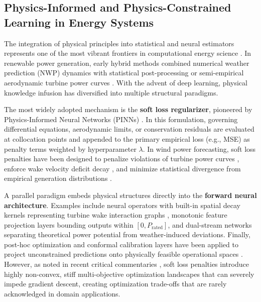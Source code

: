 \documentclass[preprint,3p,times]{elsarticle}
\begin{document}
\subsection{Physics-Informed and Physics-Constrained Learning in Energy Systems}
The integration of physical principles into statistical and neural estimators represents one of the most vibrant frontiers in computational energy science \cite{karniadakis2021physics,raissi2019physics}. In renewable power generation, early hybrid methods combined numerical weather prediction (NWP) dynamics with statistical post-processing or semi-empirical aerodynamic turbine power curves \cite{madsen2005,yan2016review}. With the advent of deep learning, physical knowledge infusion has diversified into multiple structural paradigms.

The most widely adopted mechanism is the \textbf{soft loss regularizer}, pioneered by Physics-Informed Neural Networks (PINNs) \cite{raissi2019physics}. In this formulation, governing differential equations, aerodynamic limits, or conservation residuals are evaluated at collocation points and appended to the primary empirical loss (e.g., MSE) as penalty terms weighted by hyperparameter $\lambda$. In wind power forecasting, soft loss penalties have been designed to penalize violations of turbine power curves \cite{tgdpf2025}, enforce wake velocity deficit decay \cite{sheng2025annreview}, and minimize statistical divergence from empirical generation distributions \cite{pct2026}. 

A parallel paradigm embeds physical structures directly into the \textbf{forward neural architecture}. Examples include neural operators with built-in spatial decay kernels representing turbine wake interaction graphs \cite{sheng2025annreview}, monotonic feature projection layers bounding outputs within $[0, P_{\text{rated}}]$, and dual-stream networks separating theoretical power potential from weather-induced deviations. Finally, post-hoc optimization and conformal calibration layers have been applied to project unconstrained predictions onto physically feasible operational spaces \cite{madsen2005}. However, as noted in recent critical commentaries \cite{krishnapriyan2021}, soft loss penalties introduce highly non-convex, stiff multi-objective optimization landscapes that can severely impede gradient descent, creating optimization trade-offs that are rarely acknowledged in domain applications.
\end{document}

